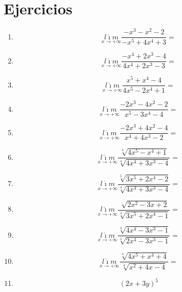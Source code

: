 \documentclass[oneside,spanish,letter]{article}
\begin{document}
\section{Ejercicios}
\begin{enumerate}
 \item $$\underset{x\rightarrow +\infty}{l\acute{\imath}m} \frac{-x^3-x^2-2}{-x^5+4x^4+3}=$$
 \item $$\underset{x\rightarrow +\infty}{l\acute{\imath}m} \frac{-x^4+2x^3-4}{4x^4+2x^3-3}=$$
 \item $$\underset{x\rightarrow +\infty}{l\acute{\imath}m} \frac{x^5+x^4-4}{4x^5-2x^4+1}=$$
 \item $$\underset{x\rightarrow +\infty}{l\acute{\imath}m} \frac{-2x^3-4x^2-2}{x^5-3x^4-4}=$$
 \item $$\underset{x\rightarrow +\infty}{l\acute{\imath}m} \frac{-2x^3+4x^2-4}{x^4+4x^3-2}=$$
 \item $$\underset{x\rightarrow +\infty}{l\acute{\imath}m} \frac{\sqrt[4]{4x^5-x^4+1}}{\sqrt[4]{4x^4+3x^3-4}}=$$
 \item $$\underset{x\rightarrow +\infty}{l\acute{\imath}m} \frac{\sqrt[5]{3x^5+2x^4-2}}{\sqrt[4]{4x^4+3x^3-4}}=$$
 \item $$\underset{x\rightarrow +\infty}{l\acute{\imath}m} \frac{\sqrt[]{2x^2-3x+2}}{\sqrt[4]{3x^5+2x^4-1}}=$$
 \item $$\underset{x\rightarrow +\infty}{l\acute{\imath}m} \frac{\sqrt[3]{4x^4-3x^3-1}}{\sqrt[5]{2x^4-3x^3-1}}=$$
 \item $$\underset{x\rightarrow +\infty}{l\acute{\imath}m} \frac{\sqrt[4]{4x^5+x^4+4}}{\sqrt[4]{x^2+4x-4}}=$$
\item $$(2x+3y)^5$$
 \end{enumerate}
  \newpage
\end{document}
